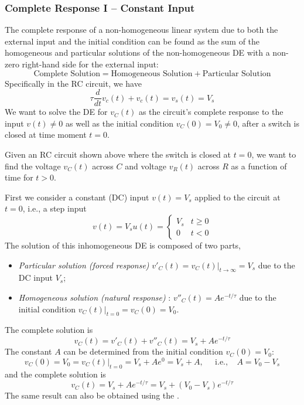 

\subsubsection*{Complete Response I -- Constant Input}

The complete response of a non-homogeneous linear system due to both
the external input and the initial condition can be found as the sum of 
the homogeneous and particular solutions of the non-homogeneous DE with 
a non-zero right-hand side for the external input:
\[
\mbox{Complete Solution}=\mbox{Homogeneous Solution}+\mbox{Particular Solution}
\]
Specifically in the RC circuit, we have
\[
\tau\frac{d}{dt} v_c(t)+v_c(t)=v_s(t)=V_s
\]
We want to solve the DE for $v_C(t)$ as the circuit's complete response to the
input $v(t)\ne 0$ as well as the initial condition $v_C(0)=V_0\ne 0$, after a 
switch is closed at time moment $t=0$. 



Given an RC circuit shown above where the switch is closed at $t=0$,
we want to find the voltage $v_C(t)$ across $C$ and voltage $v_R(t)$ 
across $R$ as a function of time for $t>0$. 

First we consider a constant (DC) input $v(t)=V_s$ applied to the circuit 
at $t=0$, i.e., a step input 
\[
v(t)=V_s u(t) =\left\{ \begin{array}{ll}V_s & t\ge 0\\0 & t<0\end{array}\right. 
\]
The solution of this inhomogeneous DE is composed of two parts, 
\begin{itemize}
\item {\em Particular solution (forced response) }
  $v'_C(t)=v_C(t)|_{t\rightarrow \infty}=V_s$ due to the DC input $V_s$;
\item {\em Homogeneous solution (natural response) }: 
  $v''_C(t)=A e^{-t/\tau}$ due to the initial condition
  $v_C(t)\big|_{t=0}=v_C(0)=V_0$.
\end{itemize}
The complete solution is
\[
v_C(t)=v'_C(t)+v''_C(t)=V_s+A e^{-t/\tau}	
\]
The constant $A$ can be determined from the initial condition $v_C(0)=V_0$:
\[
v_C(0)=V_0=v_C(t)\big|_{t=0}=V_s+Ae^{0}=V_s+A,
\;\;\;\;\;\mbox{i.e.,}\;\;\;\;A=V_0-V_s	
\]
and the complete solution is
\[
v_C(t)=V_s+A e^{-t/\tau}=V_s+(V_0-V_s) e^{-t/\tau}	
\]
The same result can also be obtained using the 
.

